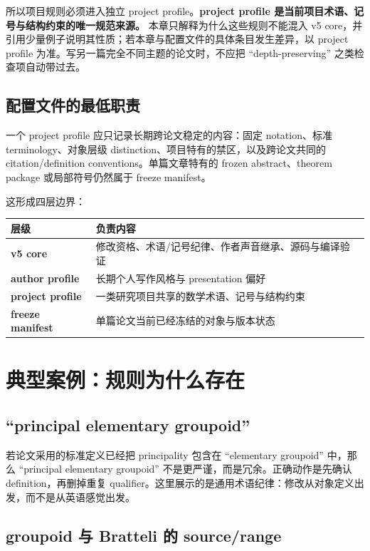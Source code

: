 \documentclass[UTF8,fontset=none,12pt,openany]{ctexbook}
\begin{document}
所以项目规则必须进入独立 project profile。\textbf{project profile 是当前项目术语、记号与结构约束的唯一规范来源。} 本章只解释为什么这些规则不能混入 v5 core，并引用少量例子说明其性质；若本章与配置文件的具体条目发生差异，以 project profile 为准。写另一篇完全不同主题的论文时，不应把 “depth-preserving” 之类检查项自动带过去。

\section{配置文件的最低职责}

一个 project profile 应只记录长期跨论文稳定的内容：固定 notation、标准 terminology、对象层级 distinction、项目特有的禁区，以及跨论文共同的 citation/definition conventions。单篇文章特有的 frozen abstract、theorem package 或局部符号仍然属于 freeze manifest。

这形成四层边界：

\begin{center}
\begin{tabularx}{0.9\textwidth}{>{\bfseries}p{3.3cm}X}
\toprule
层级 & 负责内容 \\
\midrule
v5 core & 修改资格、术语/记号纪律、作者声音继承、源码与编译验证 \\
author profile & 长期个人写作风格与 presentation 偏好 \\
project profile & 一类研究项目共享的数学术语、记号与结构约束 \\
freeze manifest & 单篇论文当前已经冻结的对象与版本状态 \\
\bottomrule
\end{tabularx}
\end{center}

\chapter{典型案例：规则为什么存在}

\section{“principal elementary groupoid”}

若论文采用的标准定义已经把 principality 包含在 “elementary groupoid” 中，那么 “principal elementary groupoid” 不是更严谨，而是冗余。正确动作是先确认 definition，再删掉重复 qualifier。这里展示的是通用术语纪律：修改从对象定义出发，而不是从英语感觉出发。

\section{groupoid 与 Bratteli 的 source/range}
\end{document}
